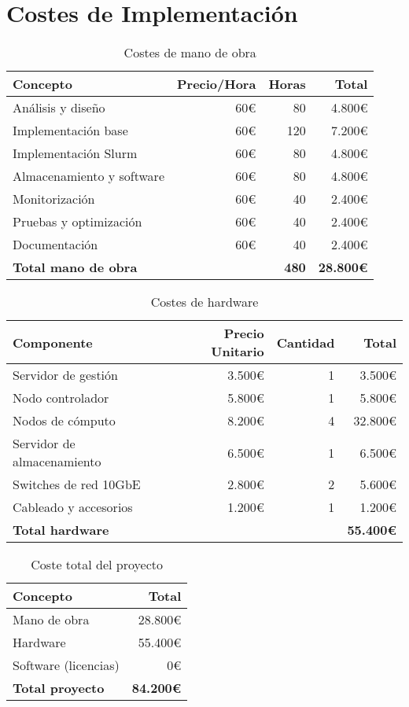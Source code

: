 \documentclass[12pt,a4paper]{report}
\begin{document}
\section{Costes de Implementación}

\begin{table}[H]
\centering
\begin{tabular}{|l|r|r|r|}
\hline
\textbf{Concepto} & \textbf{Precio/Hora} & \textbf{Horas} & \textbf{Total} \\
\hline
Análisis y diseño & 60€ & 80 & 4.800€ \\
\hline
Implementación base & 60€ & 120 & 7.200€ \\
\hline
Implementación Slurm & 60€ & 80 & 4.800€ \\
\hline
Almacenamiento y software & 60€ & 80 & 4.800€ \\
\hline
Monitorización & 60€ & 40 & 2.400€ \\
\hline
Pruebas y optimización & 60€ & 40 & 2.400€ \\
\hline
Documentación & 60€ & 40 & 2.400€ \\
\hline
\textbf{Total mano de obra} & & \textbf{480} & \textbf{28.800€} \\
\hline
\end{tabular}
\caption{Costes de mano de obra}
\label{tab:costes_mano_obra}
\end{table}

\begin{table}[H]
\centering
\begin{tabular}{|l|r|r|r|}
\hline
\textbf{Componente} & \textbf{Precio Unitario} & \textbf{Cantidad} & \textbf{Total} \\
\hline
Servidor de gestión & 3.500€ & 1 & 3.500€ \\
\hline
Nodo controlador & 5.800€ & 1 & 5.800€ \\
\hline
Nodos de cómputo & 8.200€ & 4 & 32.800€ \\
\hline
Servidor de almacenamiento & 6.500€ & 1 & 6.500€ \\
\hline
Switches de red 10GbE & 2.800€ & 2 & 5.600€ \\
\hline
Cableado y accesorios & 1.200€ & 1 & 1.200€ \\
\hline
\textbf{Total hardware} & & & \textbf{55.400€} \\
\hline
\end{tabular}
\caption{Costes de hardware}
\label{tab:costes_hardware}
\end{table}

\begin{table}[H]
\centering
\begin{tabular}{|l|r|}
\hline
\textbf{Concepto} & \textbf{Total} \\
\hline
Mano de obra & 28.800€ \\
\hline
Hardware & 55.400€ \\
\hline
Software (licencias) & 0€ \\
\hline
\textbf{Total proyecto} & \textbf{84.200€} \\
\hline
\end{tabular}
\caption{Coste total del proyecto}
\label{tab:coste_total}
\end{table}
\end{document}
